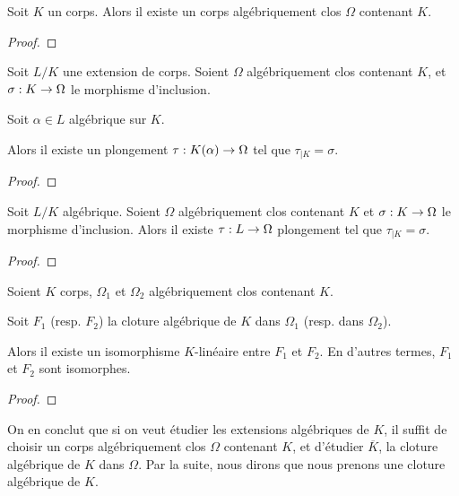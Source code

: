 \begin{theorem}
	Soit $K$ un corps. Alors il existe un corps algébriquement clos $\Omega$
	contenant $K$.
\end{theorem}

\ifdefined\outputproof
\begin{proof}

\end{proof}
\fi

\begin{lemma}
	Soit $L/K$ une extension de corps. Soient $\Omega$ algébriquement clos
	contenant $K$, et
	$\sigma : K \rightarrow \Omega$ le morphisme d'inclusion.

	Soit $\alpha \in L$ algébrique sur $K$.

	Alors il existe un plongement $\tau : K(\alpha) \rightarrow \Omega$ tel que
	$\tau_{|K} = \sigma$.
\end{lemma}

\ifdefined\outputproof
\begin{proof}

\end{proof}
\fi

\begin{theorem} 
	Soit $L/K$ algébrique.
	Soient $\Omega$ algébriquement clos contenant $K$ et $\sigma : K \rightarrow \Omega$ le
	morphisme d'inclusion.
	Alors il existe $\tau : L \rightarrow \Omega$ plongement tel que $\tau_{|K}
	= \sigma$.
\end{theorem}

\ifdefined\outputproof
\begin{proof}

\end{proof}
\fi

\begin{corollary}
	Soient $K$ corps, $\Omega_{1}$ et $\Omega_{2}$ algébriquement clos contenant
	$K$.

	Soit $F_{1}$ (resp. $F_{2}$) la cloture algébrique de $K$ dans $\Omega_{1}$
	(resp. dans $\Omega_{2}$).

	Alors il existe un isomorphisme $K$-linéaire entre $F_{1}$ et
	$F_{2}$. En d'autres termes, $F_{1}$ et $F_{2}$ sont isomorphes.
\end{corollary}

\ifdefined\outputproof
\begin{proof}

\end{proof}
\fi

On en conclut que si on veut étudier les extensions algébriques de $K$, il
suffit de choisir un corps algébriquement clos $\Omega$ contenant $K$, et
d'étudier $\overline{K}$, la cloture algébrique de $K$ dans $\Omega$. Par la
suite, nous dirons que nous prenons une cloture algébrique de $K$.

